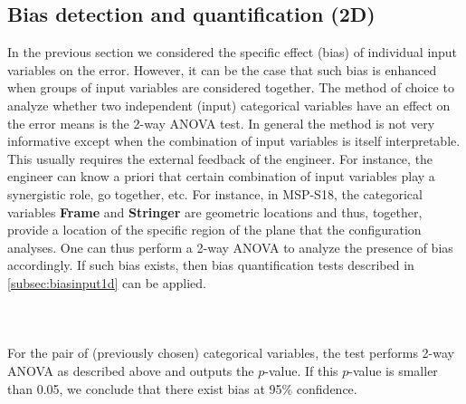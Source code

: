 \subsection{Bias detection and quantification (2D)}
In the previous section we considered the specific effect (bias) of individual input variables on the error. However, it can be the case that such bias is enhanced when groups of input variables are considered together. 
The method of choice to analyze whether two independent (input) categorical variables have an effect on the error means is the 2-way ANOVA test\cite{fujikoshi1993two}.
In general the method is not very informative except when the combination of input variables is itself interpretable. This usually requires the external feedback of the engineer. For instance, the engineer can know a priori that certain combination of input variables play a synergistic role, go together, etc.
For instance, in MSP-S18, the categorical variables \textbf{Frame} and \textbf{Stringer} are geometric locations and thus, together, provide a location of the specific region of the plane that the configuration analyses. One can thus perform a 2-way ANOVA to analyze the presence of bias accordingly. If such bias exists, then bias quantification tests described in \autoref{subsec:biasinput1d} can be applied.\\
%
\paragraph{ \\}
For the pair of (previously chosen) categorical variables, the test performs 2-way ANOVA as described above and outputs the $p$-value. If this $p$-value is smaller than 0.05, we conclude that there exist bias at 95\% confidence.\\

